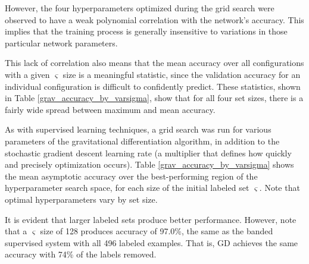 \documentclass[10pt]{article}
\begin{document}
However, the four hyperparameters optimized during the grid search were observed to have a weak polynomial correlation with the network's accuracy. This implies that the training process is generally insensitive to variations in those particular network parameters.

This lack of correlation also means that the mean accuracy over all configurations with a given $\varsigma$ size is a meaningful statistic, since the validation accuracy for an individual configuration is difficult to confidently predict. These statistics, shown in Table \ref{grav_accuracy_by_varsigma}, show that for all four set sizes, there is a fairly wide spread between maximum and mean accuracy.

As with supervised learning techniques, a grid search was run for various parameters of the gravitational differentiation algorithm, in addition to the stochastic gradient descent learning rate (a multiplier that defines how quickly and precisely optimization occurs). Table \ref{grav_accuracy_by_varsigma} shows the mean asymptotic accuracy over the best-performing region of the hyperparameter search space, for each size of the initial labeled set $\varsigma$. Note that optimal hyperparameters vary by set size.

It is evident that larger labeled sets produce better performance. However, note that a $\varsigma$ size of 128 produces accuracy of 97.0\%, the same as the banded supervised system with all 496 labeled examples. That is, GD achieves the same accuracy with 74\% of the labels removed.
\end{document}
